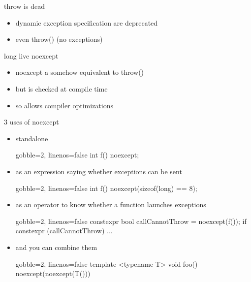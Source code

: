\begin{frame}[fragile]
  \begin{block}{throw is dead}
    \begin{itemize}
    \item dynamic exception specification are deprecated
    \item even throw() (no exceptions)
    \end{itemize}
  \end{block}
  \pause
  \begin{exampleblock}{long live noexcept}
    \begin{itemize}
    \item noexcept a somehow equivalent to throw()
    \item but is checked at compile time
    \item so allows compiler optimizations
    \end{itemize}
  \end{exampleblock}
\end{frame}

\begin{frame}[fragile]
  \begin{block}{3 uses of noexcept}
    \begin{itemize}
    \item standalone
      \begin{cppcode*}{gobble=2, linenos=false}
        int f() noexcept;
      \end{cppcode*}
    \item as an expression saying whether exceptions can be sent
      \begin{cppcode*}{gobble=2, linenos=false}
        int f() noexcept(sizeof(long) == 8);
      \end{cppcode*}
    \item as an operator to know whether a function launches exceptions
      \begin{cppcode*}{gobble=2, linenos=false}
        constexpr bool callCannotThrow = noexcept(f());
        if constexpr (callCannotThrow) { ... }
      \end{cppcode*}
    \item and you can combine them
      \begin{cppcode*}{gobble=2, linenos=false}
        template <typename T> void foo()
             noexcept(noexcept(T())) {}
      \end{cppcode*}
   \end{itemize}
  \end{block}
\end{frame}


